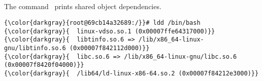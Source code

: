 % 

\subsection{\ldd}
\label{sec:ldd}
The command  \ prints shared object dependencies.
{\footnotesize{
\begin{Verbatim}[commandchars=\\\{\}]
{\color{darkgray}{root@69cb14a32689:/}}# ldd /bin/bash
{\color{darkgray}{	linux-vdso.so.1 (0x00007ffe64317000)}}
{\color{darkgray}{	libtinfo.so.6 => /lib/x86_64-linux-gnu/libtinfo.so.6 (0x00007f842112d000)}}
{\color{darkgray}{	libc.so.6 => /lib/x86_64-linux-gnu/libc.so.6 (0x00007f8420f04000)}}
{\color{darkgray}{	/lib64/ld-linux-x86-64.so.2 (0x00007f84212e3000)}}
\end{Verbatim}
}}

\endinput  %
